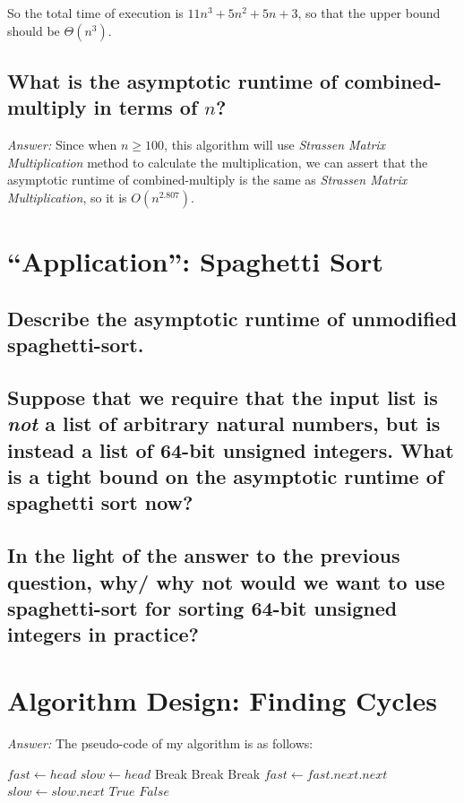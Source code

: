 \documentclass[11pt]{article}
\begin{document}
	So the total time of execution is $11n^3+5n^2+5n+3$, so that the upper bound should be $\Theta(n^3)$.
\subsection{What is the asymptotic runtime of combined-multiply in terms of $n$?}
	\emph{Answer:} Since when $n\geq100$, this algorithm will use \emph{Strassen Matrix Multiplication} method to calculate the multiplication, we can assert that the asymptotic runtime of combined-multiply is the same as \emph{Strassen Matrix Multiplication}, so it is $O(n^{2.807})$.
\section{``Application'': Spaghetti Sort}
\subsection{Describe the asymptotic runtime of unmodified spaghetti-sort.}
	
\subsection{Suppose that we require that the input list is \emph{not} a list of arbitrary natural numbers, but is instead a list of 64-bit unsigned integers. What is a tight bound on the asymptotic runtime of spaghetti sort now?}
	
\subsection{In the light of the answer to the previous question, why/ why not would we want to use spaghetti-sort for sorting 64-bit unsigned integers in practice?}
	
\section{Algorithm Design: Finding Cycles}
	\emph{Answer:} The pseudo-code of my algorithm is as follows:
	
	\begin{algorithmic}
		\State $fast\gets head$
		\State $slow\gets head$
				\State Break
			\EndIf
				\State Break
			\EndIf
				\State Break
			\EndIf
			\State $fast \gets fast.next.next$
			\State $slow \gets slow.next$
				\State \Return $True$
			\EndIf
		\EndWhile
		\State \Return $False$
	\end{algorithmic}
\end{document}
